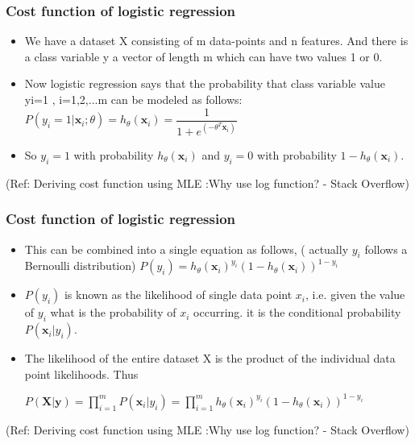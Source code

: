 \begin{frame}[fragile]\frametitle{Cost function of logistic regression}
\begin{itemize}
\item We have a dataset X consisting of m data-points and n features. And there is a class variable y a vector of length m which can have two values 1 or 0.
\item  Now logistic regression says that the probability that class variable value yi=1 , i=1,2,...m can be modeled as follows:
$P( y_i =1 | \mathbf{x}_i ; \theta) = h_{\theta}(\mathbf{x}_i) = \dfrac{1}{1+e^{(- \theta^T \mathbf{x}_i)}}$
\item So $y_i = 1$ with probability $h_{\theta}(\mathbf{x}_i)$ and $y_i=0$ with probability $1-h_{\theta}(\mathbf{x}_i)$.
\end{itemize}

{\tiny (Ref: Deriving cost function using MLE :Why use log function? - Stack Overflow)}
\end{frame}

\begin{frame}[fragile]\frametitle{Cost function of logistic regression}
\begin{itemize}
\item This can be combined into a single equation as follows, ( actually $y_i$ follows a Bernoulli distribution)
$P(y_i ) = h_{\theta}(\mathbf{x}_i)^{y_i} (1 - h_{\theta}(\mathbf{x}_i))^{1-y_i}$
\item $P(y_i)$ is known as the likelihood of single data point $x_i$, i.e. given the value of $y_i$ what is the probability of $x_i$ occurring. it is the conditional probability $P(\mathbf{x}_i | y_i)$.
\item The likelihood of the entire dataset X is the product of the individual data point likelihoods. Thus

$P(\mathbf{X}|\mathbf{y}) = \prod_{i=1}^{m} P(\mathbf{x}_i | y_i) = \prod_{i=1}^{m} h_{\theta}(\mathbf{x}_i)^{y_i} (1 - h_{\theta}(\mathbf{x}_i))^{1-y_i}$
\end{itemize}

{\tiny (Ref: Deriving cost function using MLE :Why use log function? - Stack Overflow)}
\end{frame}

